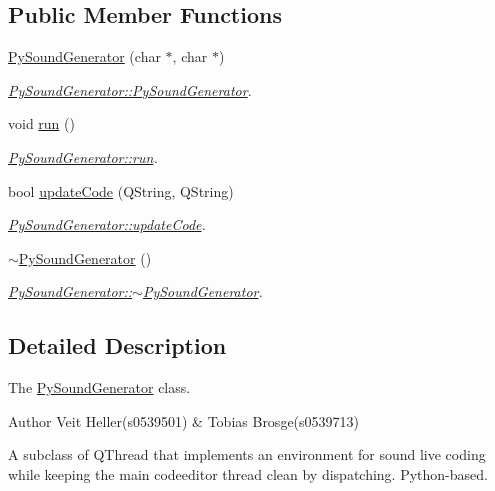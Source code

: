 \subsection*{Public Member Functions}
\begin{DoxyCompactItemize}
\item 
\hyperlink{classPySoundGenerator_a6a39079f1420a4160c9556ca25f136dc}{Py\+Sound\+Generator} (char $\ast$, char $\ast$)
\begin{DoxyCompactList}\small\item\em \hyperlink{classPySoundGenerator_a6a39079f1420a4160c9556ca25f136dc}{Py\+Sound\+Generator\+::\+Py\+Sound\+Generator}. \end{DoxyCompactList}\item 
void \hyperlink{classPySoundGenerator_acfd10c83de4bff94c8a46710d918a7e9}{run} ()
\begin{DoxyCompactList}\small\item\em \hyperlink{classPySoundGenerator_acfd10c83de4bff94c8a46710d918a7e9}{Py\+Sound\+Generator\+::run}. \end{DoxyCompactList}\item 
bool \hyperlink{classPySoundGenerator_a1e45078f4f0b740c849d0c927fa929f1}{update\+Code} (Q\+String, Q\+String)
\begin{DoxyCompactList}\small\item\em \hyperlink{classPySoundGenerator_a1e45078f4f0b740c849d0c927fa929f1}{Py\+Sound\+Generator\+::update\+Code}. \end{DoxyCompactList}\item 
\hyperlink{classPySoundGenerator_aeff90baafa85e12589195ce8206426bf}{$\sim$\+Py\+Sound\+Generator} ()
\begin{DoxyCompactList}\small\item\em \hyperlink{classPySoundGenerator_aeff90baafa85e12589195ce8206426bf}{Py\+Sound\+Generator\+::$\sim$\+Py\+Sound\+Generator}. \end{DoxyCompactList}\end{DoxyCompactItemize}


\subsection{Detailed Description}
The \hyperlink{classPySoundGenerator}{Py\+Sound\+Generator} class. 

\begin{DoxyAuthor}{Author}
Veit Heller(s0539501) \& Tobias Brosge(s0539713)
\end{DoxyAuthor}
A subclass of Q\+Thread that implements an environment for sound live coding while keeping the main codeeditor thread clean by dispatching. Python-\/based. 

